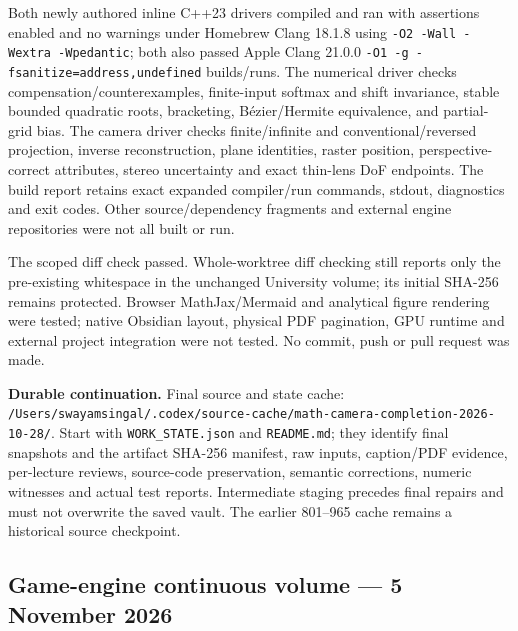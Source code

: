 Both newly authored inline C++23 drivers compiled and ran with assertions enabled and no warnings under Homebrew Clang 18.1.8 using \texttt{-O2\ -Wall\ -Wextra\ -Wpedantic}; both also passed Apple Clang 21.0.0 \texttt{-O1\ -g\ -fsanitize=address,undefined} builds/runs. The numerical driver checks compensation/counterexamples, finite-input softmax and shift invariance, stable bounded quadratic roots, bracketing, Bézier/Hermite equivalence, and partial-grid bias. The camera driver checks finite/infinite and conventional/reversed projection, inverse reconstruction, plane identities, raster position, perspective-correct attributes, stereo uncertainty and exact thin-lens DoF endpoints. The build report retains exact expanded compiler/run commands, stdout, diagnostics and exit codes. Other source/dependency fragments and external engine repositories were not all built or run.

The scoped diff check passed. Whole-worktree diff checking still reports only the pre-existing whitespace in the unchanged University volume; its initial SHA-256 remains protected. Browser MathJax/Mermaid and analytical figure rendering were tested; native Obsidian layout, physical PDF pagination, GPU runtime and external project integration were not tested. No commit, push or pull request was made.

\textbf{Durable continuation.} Final source and state cache: \texttt{/Users/swayamsingal/.codex/source-cache/math-camera-completion-2026-10-28/}. Start with \texttt{WORK\_STATE.json} and \texttt{README.md}; they identify final snapshots and the artifact SHA-256 manifest, raw inputs, caption/PDF evidence, per-lecture reviews, source-code preservation, semantic corrections, numeric witnesses and actual test reports. Intermediate staging precedes final repairs and must not overwrite the saved vault. The earlier 801--965 cache remains a historical source checkpoint.

\subsection{Game-engine continuous volume --- 5 November 2026}\label{appendix-a103e7846d21-game-engine-continuous-volume-5-november-2026}

